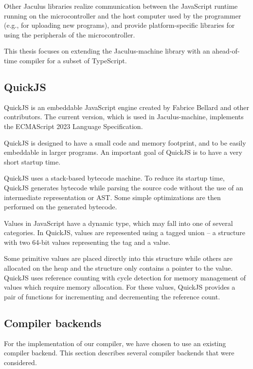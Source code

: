 Other Jaculus libraries realize communication between the JavaScript runtime running on the microcontroller and the host computer used by the programmer (e.g., for uploading new programs), and provide platform-specific libraries for using the peripherals of the microcontroller.

This thesis focuses on extending the Jaculus-machine library with an ahead-of-time compiler for a subset of TypeScript.


\subsection{QuickJS}

QuickJS is an embeddable JavaScript engine created by Fabrice Bellard and other contributors\cite{quickjs}. The current version, which is used in Jaculus-machine, implements the ECMAScript 2023 Language Specification\cite{ecma262}.

QuickJS is designed to have a small code and memory footprint, and to be easily embeddable in larger programs. An important goal of QuickJS is to have a very short startup time.

QuickJS uses a stack-based bytecode machine. To reduce its startup time, QuickJS generates bytecode while parsing the source code without the use of an intermediate representation or AST. Some simple optimizations are then performed on the generated bytecode.

Values in JavaScript have a dynamic type, which may fall into one of several categories. In QuickJS, values are represented using a tagged union -- a structure with two 64-bit values representing the tag and a value.

Some primitive values are placed directly into this structure while others are allocated on the heap and the structure only contains a pointer to the value. QuickJS uses reference counting with cycle detection for memory management of values which require memory allocation. For these values, QuickJS provides a pair of functions for incrementing and decrementing the reference count.



\subsection{Compiler backends}

For the implementation of our compiler, we have chosen to use an existing compiler backend. This section describes several compiler backends that were considered.


